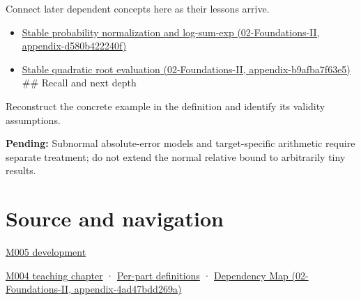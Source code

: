 Connect later dependent concepts here as their lessons arrive.

\begin{itemize}
\tightlist
\item
  \href{../02-Foundations-II/main.pdf\#nameddest=appendix-d580b422240f}{Stable probability normalization and log-sum-exp (02-Foundations-II, appendix-d580b422240f)}
\item
  \href{../02-Foundations-II/main.pdf\#nameddest=appendix-b9afba7f63e5}{Stable quadratic root evaluation (02-Foundations-II, appendix-b9afba7f63e5)} \#\# Recall and next depth
\end{itemize}

Reconstruct the concrete example in the definition and identify its validity assumptions.

\textbf{Pending:} Subnormal absolute-error models and target-specific arithmetic require separate treatment; do not extend the normal relative bound to arbitrarily tiny results.

\section{Source and navigation}\label{appendix-bc44f7b42f42-source-and-navigation}

\href{Continuous\%20Notes/Computing\%20Foundations\%20-\%20From\%20Bits\%20to\%20C++\%20and\%20Systems\%20APIs\#When\%20arithmetic\%20meets\%20uncertainty}{M005 development}

\href{Continuous\%20Notes/Computing\%20Foundations\%20-\%20From\%20Bits\%20to\%20C++\%20and\%20Systems\%20APIs\#A\%20stretching\%20ruler\%20for\%20real-valued\%20quantities}{M004 teaching chapter} · \hyperref[appendix-fd090d982a15-m004---parts-61-76]{Per-part definitions} · \href{../02-Foundations-II/main.pdf\#nameddest=appendix-4ad47bdd269a}{Dependency Map (02-Foundations-II, appendix-4ad47bdd269a)}
